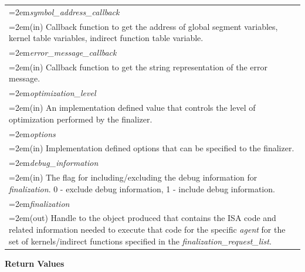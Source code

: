 \documentclass[final,oneside]{book}
\newcommand{\refarg}[1]{\textit{#1}}
\begin{document}
\begin{longtable}{@{}>{\hangindent=2em}p{\textwidth}}
\refarg{symbol_\-address_\-callback}\\\hspace{2em}(in) Callback function to get the address of global segment variables, kernel table variables, indirect function table variable.\\[2mm]
\refarg{error_\-message_\-callback}\\\hspace{2em}(in) Callback function to get the string representation of the error message.\\[2mm]
\refarg{optimization_\-level}\\\hspace{2em}(in) An implementation defined value that controls the level of optimization performed by the finalizer.\\[2mm]
\refarg{options}\\\hspace{2em}(in) Implementation defined options that can be specified to the finalizer.\\[2mm]
\refarg{debug_\-information}\\\hspace{2em}(in) The flag for including/excluding the debug information for \textit{finalization}. 0 - exclude debug information, 1 - include debug information.\\[2mm]
\refarg{finalization}\\\hspace{2em}(out) Handle to the object produced that contains the ISA code and related information needed to execute that code for the specific \textit{agent} for the set of kernels/indirect functions specified in the \textit{finalization_\-request_\-list}.
\end{longtable}
\vspace{-5mm}\noindent\textbf{Return Values}\\[-6mm]
\end{document}
